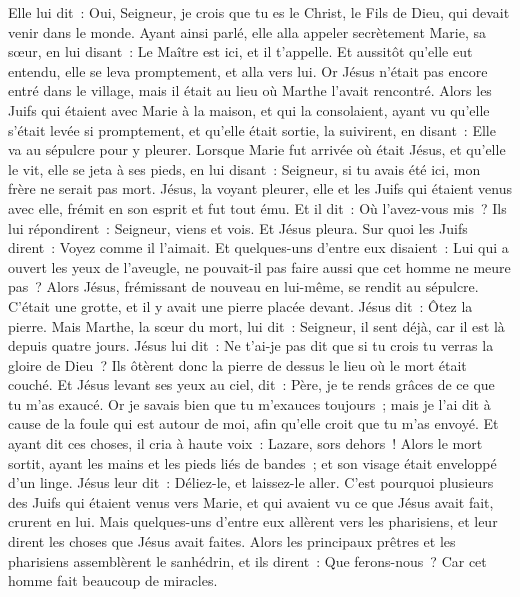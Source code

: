 \begin{multicols}{2}
Elle lui dit~: Oui, Seigneur, je crois que tu es le Christ, le Fils de Dieu, qui devait venir dans le monde.
Ayant ainsi parlé, elle alla appeler secrètement Marie, sa sœur, en lui disant~: Le Maître est ici, et il t'appelle.
Et aussitôt qu'elle eut entendu, elle se leva promptement, et alla vers lui.
Or Jésus n'était pas encore entré dans le village, mais il était au lieu où Marthe l'avait rencontré.
Alors les Juifs qui étaient avec Marie à la maison, et qui la consolaient, ayant vu qu'elle s'était levée si promptement, et qu'elle était sortie, la suivirent, en disant~: Elle va au sépulcre pour y pleurer.
Lorsque Marie fut arrivée où était Jésus, et qu'elle le vit, elle se jeta à ses pieds, en lui disant~: Seigneur, si tu avais été ici, mon frère ne serait pas mort.
Jésus, la voyant pleurer, elle et les Juifs qui étaient venus avec elle, frémit en son esprit et fut tout ému.
Et il dit~: Où l'avez-vous mis~? Ils lui répondirent~: Seigneur, viens et vois.
Et Jésus pleura.
Sur quoi les Juifs dirent~: Voyez comme il l'aimait.
Et quelques-uns d'entre eux disaient~: Lui qui a ouvert les yeux de l'aveugle, ne pouvait-il pas faire aussi que cet homme ne meure pas~?
Alors Jésus, frémissant de nouveau en lui-même, se rendit au sépulcre. C'était une grotte, et il y avait une pierre placée devant.
Jésus dit~: Ôtez la pierre. Mais Marthe, la sœur du mort, lui dit~: Seigneur, il sent déjà, car il est là depuis quatre jours.
Jésus lui dit~: Ne t'ai-je pas dit que si tu crois tu verras la gloire de Dieu~?
Ils ôtèrent donc la pierre de dessus le lieu où le mort était couché. Et Jésus levant ses yeux au ciel, dit~: Père, je te rends grâces de ce que tu m'as exaucé.
Or je savais bien que tu m'exauces toujours~; mais je l'ai dit à cause de la foule qui est autour de moi, afin qu'elle croit que tu m'as envoyé.
Et ayant dit ces choses, il cria à haute voix~: Lazare, sors dehors~!
Alors le mort sortit, ayant les mains et les pieds liés de bandes~; et son visage était enveloppé d'un linge. Jésus leur dit~: Déliez-le, et laissez-le aller.
C'est pourquoi plusieurs des Juifs qui étaient venus vers Marie, et qui avaient vu ce que Jésus avait fait, crurent en lui.
Mais quelques-uns d'entre eux allèrent vers les pharisiens, et leur dirent les choses que Jésus avait faites.
Alors les principaux prêtres et les pharisiens assemblèrent le sanhédrin, et ils dirent~: Que ferons-nous~? Car cet homme fait beaucoup de miracles.

\end{multicols}
